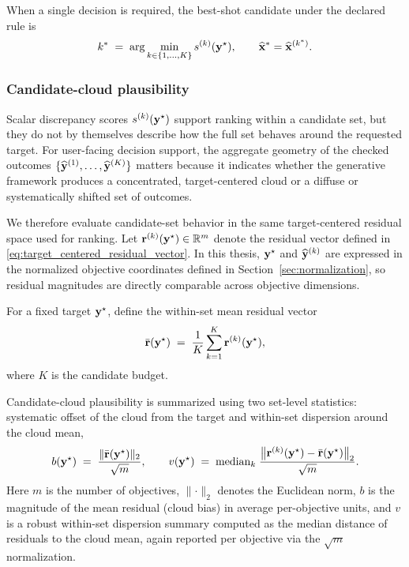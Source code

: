 When a single decision is required, the best-shot candidate under the declared rule is
\begin{equation}
  k^{\ast}
  \;=\;
  \arg\min_{k\in\{1,\dots,K\}} s^{(k)}(\mathbf{y}^{\star}),
  \qquad
  \widehat{\mathbf{x}}^{\ast}=\widehat{\mathbf{x}}^{(k^{\ast})}.
  \label{eq:best_shot_def}
\end{equation}

\subsubsection{Candidate-cloud plausibility}\label{sec:eval_candidate_cloud}

Scalar discrepancy scores $s^{(k)}(\mathbf{y}^{\star})$ support ranking within a candidate set, but they
do not by themselves describe how the full set behaves around the requested target. For user-facing
decision support, the aggregate geometry of the checked outcomes
$\{ \widehat{\mathbf{y}}^{(1)}, \dots, \widehat{\mathbf{y}}^{(K)} \}$ matters because it indicates whether the generative framework produces a concentrated, target-centered cloud or a diffuse or systematically
shifted set of outcomes.

We therefore evaluate candidate-set behavior in the same target-centered residual space used for
ranking. Let $\mathbf{r}^{(k)}(\mathbf{y}^{\star})\in\mathbb{R}^{m}$ denote the residual vector defined in
\eqref{eq:target_centered_residual_vector}. In this thesis, $\mathbf{y}^{\star}$ and
$\widehat{\mathbf{y}}^{(k)}$ are expressed in the normalized objective coordinates defined in
Section~\ref{sec:normalization}, so residual magnitudes are directly comparable across objective
dimensions.

For a fixed target $\mathbf{y}^{\star}$, define the within-set mean residual vector
\begin{equation}
  \bar{\mathbf{r}}(\mathbf{y}^{\star})
  \;=\;
  \frac{1}{K}\sum_{k=1}^{K}\mathbf{r}^{(k)}(\mathbf{y}^{\star}),
  \label{eq:mean_residual_vector_cloud}
\end{equation}
where $K$ is the candidate budget.

Candidate-cloud plausibility is summarized using two set-level statistics: systematic offset of the
cloud from the target and within-set dispersion around the cloud mean,
\begin{equation}
  b(\mathbf{y}^{\star})
  \;=\;
  \frac{\lVert \bar{\mathbf{r}}(\mathbf{y}^{\star}) \rVert_2}{\sqrt{m}},
  \qquad
  v(\mathbf{y}^{\star})
  \;=\;
  \mathrm{median}_{k}\;
  \frac{\big\lVert \mathbf{r}^{(k)}(\mathbf{y}^{\star})-\bar{\mathbf{r}}(\mathbf{y}^{\star}) \big\rVert_2}{\sqrt{m}}.
  \label{eq:residual_bias_dispersion}
\end{equation}
Here $m$ is the number of objectives, $\lVert\cdot\rVert_2$ denotes the Euclidean norm, $b$ is the
magnitude of the mean residual (cloud bias) in average per-objective units, and $v$ is a robust
within-set dispersion summary computed as the median distance of residuals to the cloud mean, again
reported per objective via the $\sqrt{m}$ normalization.

